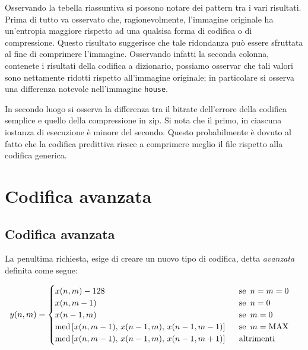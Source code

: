 \noindent Osservando la tebella riassuntiva si possono notare dei pattern tra i vari risultati. Prima di tutto va osservato che, ragionevolmente, l'immagine originale ha un'entropia maggiore rispetto ad una qualsisa forma di codifica o di compressione. Questo risultato suggerisce che tale ridondanza può essere sfruttata al fine di comprimere l'immagine. Osservando infatti la seconda colonna, contenete i risultati della codifica a dizionario, possiamo osservar che tali valori sono nettamente ridotti rispetto all'immagine originale; in particolare si osserva una differenza notevole nell'immagine \texttt{house}. 

In secondo luogo si osserva la differenza tra il bitrate dell'errore della codifica semplice e quello della compressione in zip. Si nota che il primo, in ciascuna iostanza di esecuzione è minore del secondo. Questo probabilmente è dovuto al fatto che la codifica predittiva riesce a comprimere meglio il file rispetto alla codifica generica. 





\newpage\section{Codifica avanzata}

\vspace{15px}\subsection{Codifica avanzata}

La penultima richiesta, esige di creare un nuovo tipo di codifica, detta \textsl{avanzata} definita come segue:

\begin{gather*}
    y(n, m) = 
    \begin{cases}
        x(n, m) - 128 \hspace{161px} \text{se } \, n = m = 0 \\
        x(n, m - 1) \hspace{171px} \text{se } \, n = 0\\
        x(n - 1, m) \hspace{171px} \text{se } \, m = 0\\
        \text{med}\left[ x(n, m - 1),\, x(n - 1, m),\, x(n - 1, m - 1) \right] \hspace{15px} \text{se } \, m = \text{MAX}\\
        \text{med}\left[ x(n, m - 1),\, x(n - 1, m),\, x(n - 1, m + 1) \right] \hspace{15px} \text{altrimenti}
    \end{cases}
\end{gather*} 

